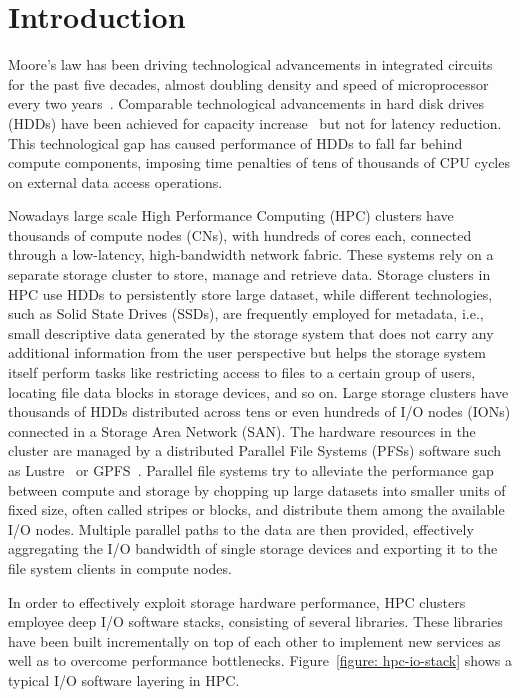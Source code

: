 \chapter{Introduction} \label{cap: introduction}
Moore's law has been driving technological advancements in integrated circuits for the past five decades, almost doubling density and speed of microprocessor every two years~\cite{Mack11}. Comparable
technological advancements in hard disk drives (HDDs) have been achieved for capacity increase~\cite{NIST} but not for latency reduction. This technological gap has caused performance of HDDs to fall 
far behind compute components, imposing time penalties of tens of thousands of CPU cycles on external data access operations.

Nowadays large scale High Performance Computing (HPC) clusters have thousands of compute nodes (CNs), with hundreds of cores each, connected through a low-latency, high-bandwidth network fabric. 
These systems rely on a separate storage cluster to store, manage and retrieve data. Storage clusters in HPC use HDDs to persistently store large dataset, while different technologies, such as Solid State
Drives (SSDs), are frequently employed for metadata, i.e., small descriptive data generated by the storage system that does not carry any additional information from the user perspective but helps 
the storage system itself perform tasks like restricting access to files to a certain group of users, locating file data blocks in storage devices, and so on.
Large storage clusters have thousands of HDDs distributed across tens or even hundreds of I/O nodes (IONs) connected in a Storage Area Network (SAN). The hardware resources in the cluster are managed by a 
distributed Parallel File Systems (PFSs) software such as Lustre~\cite{Braam02} or GPFS~\cite{SchmuckH02}. Parallel file systems try to alleviate the performance gap between compute and storage by chopping 
up large datasets into smaller units of fixed size, often called stripes or blocks, and distribute them among the available I/O nodes. Multiple parallel paths to the data are then provided, effectively aggregating 
the I/O bandwidth of single storage devices and exporting it to the file system clients in compute nodes. 

In order to effectively exploit storage hardware performance, HPC clusters employee deep I/O software stacks, consisting of several libraries. These libraries have been built incrementally on top of
each other to implement new services as well as to overcome performance bottlenecks. %
Figure~\ref{figure: hpc-io-stack} shows a typical I/O software layering in HPC.


